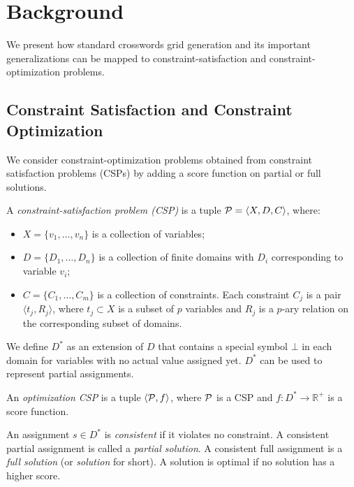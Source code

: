 

\section{Background}
\label{sec::background}

We present how standard crosswords grid generation and its important generalizations
can be mapped to constraint-satisfaction and constraint-optimization problems.

\subsection{Constraint Satisfaction and Constraint Optimization}

We consider constraint-optimization problems
obtained from
constraint satisfaction problems (CSPs) by adding a score function on partial
or full solutions.

\bdf
A \emph{constraint-satisfaction problem (CSP)} is a tuple ${\cal P} = \langle X, D, C \rangle$,
where:
\begin{itemize} 
\item $X = \{v_1, \dots, v_n\}$ is a collection of variables;
\item $D = \{D_1, \dots, D_n\}$ is a collection of finite domains with $D_i$ corresponding to variable $v_i$;
\item $C = \{C_1, \dots, C_m\}$ is a collection of constraints. Each constraint $C_j$ is a pair $\langle t_j, R_j \rangle$, where $t_j \subset X$ is a subset of $p$ variables and $R_j$ is a $p$-ary relation on the corresponding subset of domains.
\end{itemize}
\edf

\noindent We define $D^*$ as an extension of $D$ that contains a special symbol $\bot$ in each domain for variables with no actual value assigned yet. $D^*$ can be used to represent partial assignments.

\bdf
An \emph{optimization CSP} is a tuple $\langle {\cal P}, f \rangle$, 
where ${\cal P}$ is a CSP and 
$f : D^* \rightarrow \mathbb{R}^+$ is a score function.
\label{def-optimization-csp}
\edf

An assignment $s \in D^*$ is {\em consistent} if 
it violates no constraint.
A consistent partial assignment is called a {\em partial solution}.
A consistent full assignment is a {\em full solution} (or {\em solution} for short).
A solution is optimal if no solution has a higher score.

